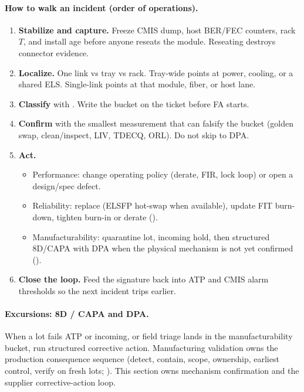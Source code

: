 \paragraph{How to walk an incident (order of operations).}
\begin{enumerate}
\item \textbf{Stabilize and capture.} Freeze CMIS dump, host BER/FEC counters, rack
      $T$, and install age before anyone reseats the module. Reseating destroys
      connector evidence.
\item \textbf{Localize.} One link vs tray vs rack. Tray-wide points at power,
      cooling, or a shared ELS. Single-link points at that module, fiber, or host
      lane.
\item \textbf{Classify} with . Write the bucket on the
      ticket before FA starts.
\item \textbf{Confirm} with the smallest measurement that can falsify the bucket
      (golden swap, clean/inspect, LIV, TDECQ, ORL). Do not skip to DPA.
\item \textbf{Act.}
      \begin{itemize}
      \item Performance: change operating policy (derate, FIR, lock loop) or open a
            design/spec defect.
      \item Reliability: replace (ELSFP hot-swap when available), update FIT burn-down,
            tighten burn-in or derate ().
      \item Manufacturability: quarantine lot, incoming hold, then structured
            8D/CAPA with DPA when the physical mechanism is not yet confirmed
            ().
      \end{itemize}
\item \textbf{Close the loop.} Feed the signature back into ATP and CMIS alarm
      thresholds so the next incident trips earlier.
\end{enumerate}

\paragraph{Excursions: 8D / CAPA and DPA.}
\label{sec:mfg-8d-capa}
When a lot fails ATP or incoming, or field triage lands in the manufacturability
bucket, run structured corrective action. Manufacturing validation owns the
production consequence sequence (detect, contain, scope, ownership, earliest
control, verify on fresh lots; ). This section owns
mechanism confirmation and the supplier corrective-action loop.

